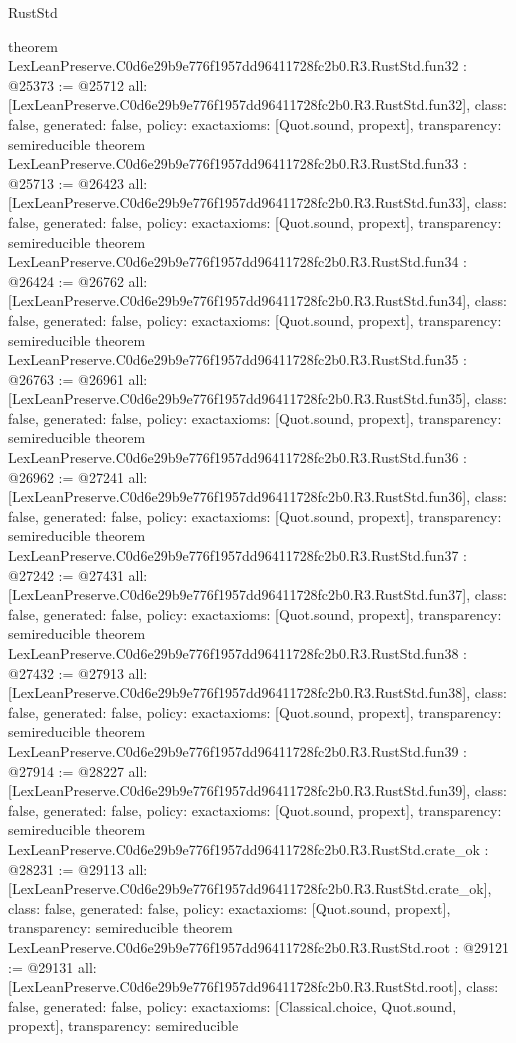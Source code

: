 \begin{lexlean}{RustStd}
\begin{coremodule}
{}
theorem LexLeanPreserve.C0d6e29b9e776f1957dd96411728fc2b0.R3.RustStd.fun32 : @25373 := @25712 {
  all: [LexLeanPreserve.C0d6e29b9e776f1957dd96411728fc2b0.R3.RustStd.fun32],
  class: false,
  generated: false,
  policy: exact{axioms: [Quot.sound, propext]},
  transparency: semireducible
}
theorem LexLeanPreserve.C0d6e29b9e776f1957dd96411728fc2b0.R3.RustStd.fun33 : @25713 := @26423 {
  all: [LexLeanPreserve.C0d6e29b9e776f1957dd96411728fc2b0.R3.RustStd.fun33],
  class: false,
  generated: false,
  policy: exact{axioms: [Quot.sound, propext]},
  transparency: semireducible
}
theorem LexLeanPreserve.C0d6e29b9e776f1957dd96411728fc2b0.R3.RustStd.fun34 : @26424 := @26762 {
  all: [LexLeanPreserve.C0d6e29b9e776f1957dd96411728fc2b0.R3.RustStd.fun34],
  class: false,
  generated: false,
  policy: exact{axioms: [Quot.sound, propext]},
  transparency: semireducible
}
theorem LexLeanPreserve.C0d6e29b9e776f1957dd96411728fc2b0.R3.RustStd.fun35 : @26763 := @26961 {
  all: [LexLeanPreserve.C0d6e29b9e776f1957dd96411728fc2b0.R3.RustStd.fun35],
  class: false,
  generated: false,
  policy: exact{axioms: [Quot.sound, propext]},
  transparency: semireducible
}
theorem LexLeanPreserve.C0d6e29b9e776f1957dd96411728fc2b0.R3.RustStd.fun36 : @26962 := @27241 {
  all: [LexLeanPreserve.C0d6e29b9e776f1957dd96411728fc2b0.R3.RustStd.fun36],
  class: false,
  generated: false,
  policy: exact{axioms: [Quot.sound, propext]},
  transparency: semireducible
}
theorem LexLeanPreserve.C0d6e29b9e776f1957dd96411728fc2b0.R3.RustStd.fun37 : @27242 := @27431 {
  all: [LexLeanPreserve.C0d6e29b9e776f1957dd96411728fc2b0.R3.RustStd.fun37],
  class: false,
  generated: false,
  policy: exact{axioms: [Quot.sound, propext]},
  transparency: semireducible
}
theorem LexLeanPreserve.C0d6e29b9e776f1957dd96411728fc2b0.R3.RustStd.fun38 : @27432 := @27913 {
  all: [LexLeanPreserve.C0d6e29b9e776f1957dd96411728fc2b0.R3.RustStd.fun38],
  class: false,
  generated: false,
  policy: exact{axioms: [Quot.sound, propext]},
  transparency: semireducible
}
theorem LexLeanPreserve.C0d6e29b9e776f1957dd96411728fc2b0.R3.RustStd.fun39 : @27914 := @28227 {
  all: [LexLeanPreserve.C0d6e29b9e776f1957dd96411728fc2b0.R3.RustStd.fun39],
  class: false,
  generated: false,
  policy: exact{axioms: [Quot.sound, propext]},
  transparency: semireducible
}
theorem LexLeanPreserve.C0d6e29b9e776f1957dd96411728fc2b0.R3.RustStd.crate_ok : @28231 := @29113 {
  all: [LexLeanPreserve.C0d6e29b9e776f1957dd96411728fc2b0.R3.RustStd.crate_ok],
  class: false,
  generated: false,
  policy: exact{axioms: [Quot.sound, propext]},
  transparency: semireducible
}
theorem LexLeanPreserve.C0d6e29b9e776f1957dd96411728fc2b0.R3.RustStd.root : @29121 := @29131 {
  all: [LexLeanPreserve.C0d6e29b9e776f1957dd96411728fc2b0.R3.RustStd.root],
  class: false,
  generated: false,
  policy: exact{axioms: [Classical.choice, Quot.sound, propext]},
  transparency: semireducible
}


\end{coremodule}
\end{lexlean}

